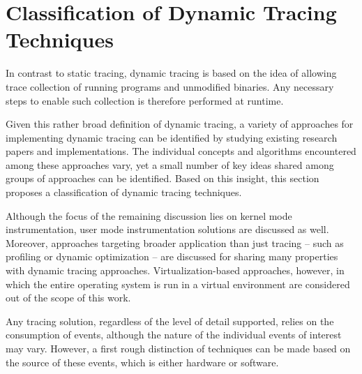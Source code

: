 %
% 
%
%

\chapter{Classification of Dynamic Tracing Techniques}
\label{sec:Classification}
In contrast to static tracing, dynamic tracing is based on the idea of allowing
trace collection of running programs and unmodified binaries. Any necessary
steps to enable such collection is therefore performed at runtime.

Given this rather broad definition of dynamic tracing, a variety of approaches for
implementing dynamic tracing can be identified by studying existing research papers
and implementations. The individual concepts and algorithms encountered among these 
approaches vary, yet a small number of key ideas shared among groups of
approaches can be identified. Based on this insight, this section proposes a classification of 
dynamic tracing techniques.

Although the focus of the remaining discussion lies on kernel mode instrumentation, user
mode instrumentation solutions are discussed as well. Moreover, approaches targeting
broader application than just tracing -- such as profiling or dynamic optimization --
are discussed for sharing many properties with dynamic tracing approaches.
Virtualization-based approaches, however, in which the entire operating system 
is run in a virtual environment are considered out of the scope of this work.
%
%
%


Any tracing solution, regardless of the level of detail supported, 
relies on the consumption of events, although the nature of the
individual events of interest may vary. However, a first rough distinction of techniques can
be made based on the source of these events, which is either hardware or software. 

